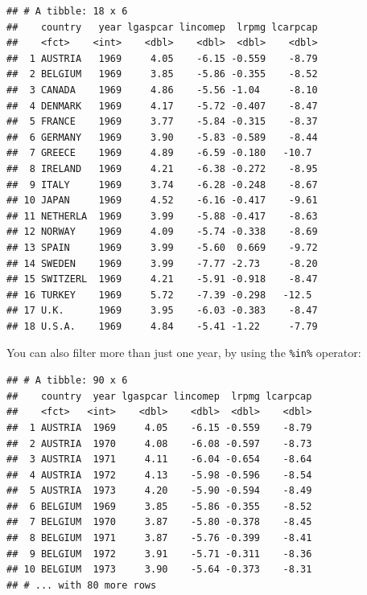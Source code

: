 \documentclass[]{gitbook}
\newenvironment{Shaded}{\begin{snugshade}}{\end{snugshade}}
\newcommand{\DecValTok}[1]{\textcolor[rgb]{0.00,0.00,0.81}{#1}}
\newcommand{\KeywordTok}[1]{\textcolor[rgb]{0.13,0.29,0.53}{\textbf{#1}}}
\newcommand{\NormalTok}[1]{#1}
\newcommand{\OperatorTok}[1]{\textcolor[rgb]{0.81,0.36,0.00}{\textbf{#1}}}
\newcommand{\StringTok}[1]{\textcolor[rgb]{0.31,0.60,0.02}{#1}}
\begin{document}
\begin{verbatim}
## # A tibble: 18 x 6
##    country   year lgaspcar lincomep  lrpmg lcarpcap
##    <fct>    <int>    <dbl>    <dbl>  <dbl>    <dbl>
##  1 AUSTRIA   1969     4.05    -6.15 -0.559    -8.79
##  2 BELGIUM   1969     3.85    -5.86 -0.355    -8.52
##  3 CANADA    1969     4.86    -5.56 -1.04     -8.10
##  4 DENMARK   1969     4.17    -5.72 -0.407    -8.47
##  5 FRANCE    1969     3.77    -5.84 -0.315    -8.37
##  6 GERMANY   1969     3.90    -5.83 -0.589    -8.44
##  7 GREECE    1969     4.89    -6.59 -0.180   -10.7 
##  8 IRELAND   1969     4.21    -6.38 -0.272    -8.95
##  9 ITALY     1969     3.74    -6.28 -0.248    -8.67
## 10 JAPAN     1969     4.52    -6.16 -0.417    -9.61
## 11 NETHERLA  1969     3.99    -5.88 -0.417    -8.63
## 12 NORWAY    1969     4.09    -5.74 -0.338    -8.69
## 13 SPAIN     1969     3.99    -5.60  0.669    -9.72
## 14 SWEDEN    1969     3.99    -7.77 -2.73     -8.20
## 15 SWITZERL  1969     4.21    -5.91 -0.918    -8.47
## 16 TURKEY    1969     5.72    -7.39 -0.298   -12.5 
## 17 U.K.      1969     3.95    -6.03 -0.383    -8.47
## 18 U.S.A.    1969     4.84    -5.41 -1.22     -7.79
\end{verbatim}

You can also filter more than just one year, by using the \texttt{\%in\%} operator:

\begin{Shaded}
\end{Shaded}

\begin{verbatim}
## # A tibble: 90 x 6
##    country  year lgaspcar lincomep  lrpmg lcarpcap
##    <fct>   <int>    <dbl>    <dbl>  <dbl>    <dbl>
##  1 AUSTRIA  1969     4.05    -6.15 -0.559    -8.79
##  2 AUSTRIA  1970     4.08    -6.08 -0.597    -8.73
##  3 AUSTRIA  1971     4.11    -6.04 -0.654    -8.64
##  4 AUSTRIA  1972     4.13    -5.98 -0.596    -8.54
##  5 AUSTRIA  1973     4.20    -5.90 -0.594    -8.49
##  6 BELGIUM  1969     3.85    -5.86 -0.355    -8.52
##  7 BELGIUM  1970     3.87    -5.80 -0.378    -8.45
##  8 BELGIUM  1971     3.87    -5.76 -0.399    -8.41
##  9 BELGIUM  1972     3.91    -5.71 -0.311    -8.36
## 10 BELGIUM  1973     3.90    -5.64 -0.373    -8.31
## # ... with 80 more rows
\end{verbatim}
\end{document}
